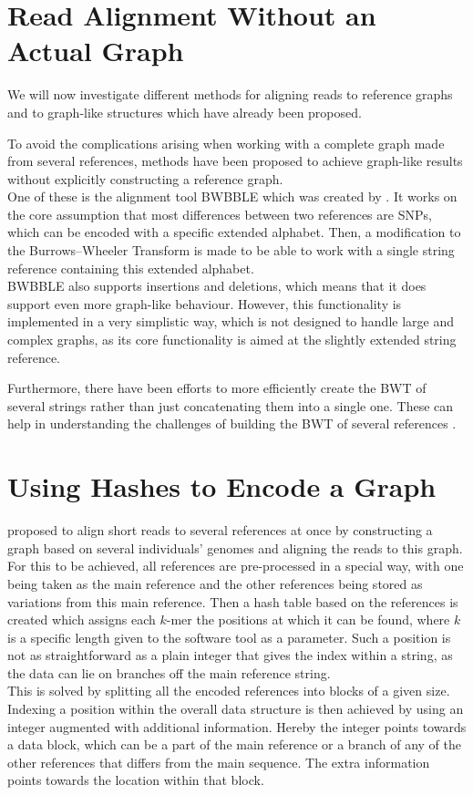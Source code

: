 \documentclass[a4paper,12pt,twoside,BCOR=10mm]{scrbook}
\begin{document}
\section{Read Alignment Without an Actual Graph}

We will now investigate different methods for aligning reads to reference graphs and to graph-like structures
which have already been proposed.

To avoid the complications arising when working with
a complete graph made from several references, methods have been proposed
to achieve graph-like results without explicitly constructing a reference graph. \\
One of these is the alignment tool BWBBLE which
was created by \citet{Huang2013}.
It works on the core assumption that most differences between two references
are SNPs, which can be encoded with a specific extended alphabet.
Then, a modification to the Burrows--Wheeler Transform is made to
be able to work with a single string reference containing this extended alphabet. \\
BWBBLE also supports insertions and deletions, which means that it does support
even more graph-like behaviour.
However, this functionality is implemented in a very simplistic way,
which is not designed to handle large and complex graphs,
as its core functionality is aimed at the slightly extended string reference.

Furthermore, there have been efforts to more efficiently create the BWT
of several strings rather than just concatenating them into a single one.
These can help in understanding the challenges of building the BWT of several references \citep{Holt2014}.

\section{Using Hashes to Encode a Graph}

\citet{Schneeberger2009} proposed to
align short reads to several references at once
by constructing a graph based on several individuals' genomes
and aligning the reads to this graph. \\
For this to be achieved, all references are pre-processed in a special way, with one being taken as the
main reference and the other references being stored as variations from this main reference.
Then a hash table based on the references is created which
assigns each $ k $-mer the positions at which it can be found,
where $ k $ is a specific length given to the software tool as a parameter.
Such a position is not as straightforward as a
plain integer that gives the index within a string, as the data can lie on branches
off the main reference string. \\
This is solved by splitting all the encoded references into blocks of a given size.
Indexing a position within the overall data structure is then achieved
by using an integer augmented with additional information.
Hereby the integer points towards a data block, which can be a part of the main
reference or a branch of any of the other references that differs from the
main sequence. The extra information points towards the location within that block.
\end{document}
